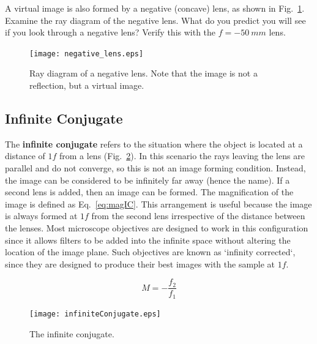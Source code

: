 \documentclass[a4paper]{report}
\begin{document}
A virtual image is also formed by a negative (concave) lens, as shown in Fig.~\ref{fig:neglens}. 
Examine the ray diagram of the negative lens. 
What do you predict you will see if you look through a negative lens?
Verify this with the $f=-50~mm$ lens.
\begin{figure}[h]
\center
\texttt{[image: negative\_lens.eps]}
\caption{Ray diagram of a negative lens. Note that the image is not a reflection, but a virtual image. }
\label{fig:neglens}
\end{figure}


\clearpage

\subsection{Infinite Conjugate}
The \textbf{infinite conjugate} refers to the situation where the object is located at a distance of $1f$ from a lens (Fig.~\ref{infiniteConjugate}). 
In this scenario the rays leaving the lens are parallel and do not converge, so this is not an image forming condition. 
Instead, the image can be considered to be infinitely far away (hence the name). 
If a second lens is added, then an image can be formed. 
The magnification of the image is defined as Eq.~\ref{eq:magIC}. 
This arrangement is useful because the image is always formed at $1f$ from the second lens irrespective of the distance between the lenses.
Most microscope objectives are designed to work in this configuration since it allows filters to be added into the infinite space without altering the location of the image plane. 
Such objectives are known as `infinity corrected`, since they are designed to produce their best images with the sample at $1f$.

\begin{equation}
M=-\frac{f_2}{f_1}
\label{eq:magIC}
\end{equation}

\begin{figure}[h]
\center
\texttt{[image: infiniteConjugate.eps]}
\caption{The infinite conjugate.}
\label{infiniteConjugate}
\end{figure}
\end{document}
